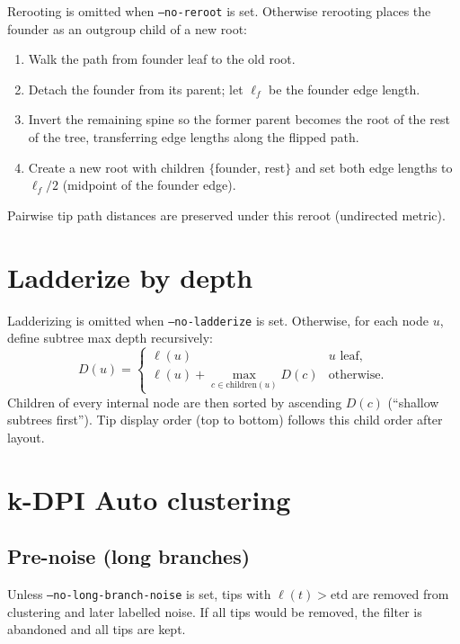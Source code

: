 \documentclass[11pt,a4paper]{article}
\begin{document}
Rerooting is omitted when \texttt{--no-reroot} is set.
Otherwise rerooting places the founder as an outgroup child of a new root:
\begin{enumerate}
  \item Walk the path from founder leaf to the old root.
  \item Detach the founder from its parent; let $\ell_{f}$ be the founder edge length.
  \item Invert the remaining spine so the former parent becomes the root of the
        rest of the tree, transferring edge lengths along the flipped path.
  \item Create a new root with children
        $\{$founder, rest$\}$
        and set both edge lengths to $\ell_{f}/2$ (midpoint of the founder edge).
\end{enumerate}
Pairwise tip path distances are preserved under this reroot (undirected metric).

\section{Ladderize by depth}
\label{sec:ladder}

Ladderizing is omitted when \texttt{--no-ladderize} is set.
Otherwise, for each node $u$, define subtree max depth recursively:
\[
  D(u)=
  \begin{cases}
    \ell(u) & u\text{ leaf},\\
    \ell(u)+\max_{c\in\mathrm{children}(u)} D(c) & \text{otherwise}.
  \end{cases}
\]
Children of every internal node are then sorted by ascending $D(c)$
(``shallow subtrees first'').
Tip display order (top to bottom) follows this child order after layout.

\section{k-DPI Auto clustering}
\label{sec:kdpis}

\subsection{Pre-noise (long branches)}
Unless \texttt{--no-long-branch-noise} is set, tips with
$\ell(t)>\mathrm{etd}$ are removed from clustering and later labelled noise.
If all tips would be removed, the filter is abandoned and all tips are kept.
\end{document}
